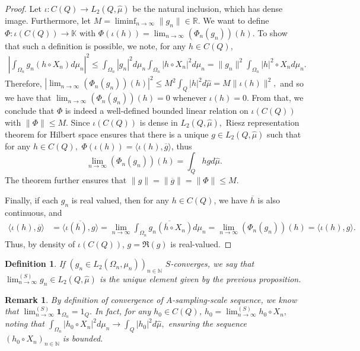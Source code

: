 \documentclass[10pt,a4paper]{amsart}
\newtheorem{definition}[thm]{Definition}
\newtheorem{remark}[thm]{Remark}
\def \HMU{\hat{\mu}}
\def \LL{\langle}
\def \RR{\rangle}
\begin{document}
\begin{proof}
	Let $\iota:C(Q)\rightarrow L_2(Q,\HMU)$ be the natural inclusion, which has dense image. Furthermore, let $M=\liminf_{n\rightarrow\infty}\|g_n\|\in\mathbb{R}.$ We want to define $\Phi:\iota(C(Q))\rightarrow\mathbb{K}$ with $\Phi(\iota(h))=\lim_{n\rightarrow\infty} (\Phi_n(g_n))(h).$ To show that such a definition is possible, we note, for any $h\in C(Q),$
	\begin{align*}
		\left|\int_{\Omega_n}g_n(h\circ X_n)d\mu_n\right|^2\leq\int_{\Omega_n}|g_n|^2d\mu_n \int_{\Omega_n}|h\circ X_n|^2d\mu_n= \|g_n\|^2 \int_{\Omega_n}|h|^2\circ X_nd\mu_n.
	\end{align*}
	Therefore, $|\lim_{n\rightarrow\infty}(\Phi_n(g_n))(h)|^2\leq M^2\int_{Q}|h|^2d\HMU=M\|\iota(h)\|^2,$ and so we have that $\lim_{n\rightarrow\infty}(\Phi_n(g_n))(h)=0$ whenever $\iota(h)=0.$ From that, we conclude that $\Phi$ is indeed a well-defined bounded linear relation on $\iota(C(Q))$ with $\|\Phi\|\leq M.$ Since $\iota(C(Q))$ is dense in $L_2(Q,\HMU),$ Riesz representation theorem for Hilbert space ensures that there is a unique $g\in L_2(Q,\HMU)$ such that for any $h\in C(Q),$ $\Phi(\iota(h))=\LL \iota(h), \overline{g}\RR$, thus $$\lim_{n\rightarrow\infty}(\Phi_n(g_n))(h)=\int_{Q}h gd\HMU.$$ The theorem further ensures that $\|g\|=\|\overline{g}\|=\|\Phi\|\leq M.$
	
	Finally, if each $g_n$ is real valued, then for any $h\in C(Q)$, we have $\overline{h}$ is also continuous, and
	\begin{align*}
		\LL \iota(h), \overline{g}\RR&= \overline{\LL \iota(\overline{h}), g\RR}=\lim_{n\rightarrow\infty}\overline{\int_{\Omega_n}g_n (\overline{h}\circ X_n)d\mu_n}=\lim_{n\rightarrow\infty}(\Phi_n(g_n))(h)=\LL \iota(h),g\RR.
	\end{align*}
	Thus, by density of $\iota(C(Q))$, $g=\Re(g)$ is real-valued.
\end{proof}
\begin{definition}
	If $(g_n\in L_2(\Omega_n,\mu_n))_{n\in\mathbb{N}}$ $S$-converges, we say that $\lim_{n\rightarrow\infty}^{(S)} g_n \in L_2(Q,\HMU)$ is the unique element given by the previous proposition.
\end{definition}
\begin{remark}\label{remark_continuous_convergence}
	By definition of convergence of $A$-sampling-scale sequence, we know that $\lim^{(S)}_{n\rightarrow\infty}\mathbf{1}_{\Omega_n}=1_{Q}.$ In fact, for any $h_0\in C(Q)$, $h_0=\lim^{(S)}_{n\rightarrow\infty}h_0\circ X_n,$ noting that $\int_{\Omega_n}|h_0\circ X_n|^2d\mu_n\rightarrow \int_{Q}|h_0|^2d\HMU,$ ensuring the sequence $(h_0\circ X_n)_{n\in\mathbb{N}}$ is bounded.
\end{remark}
\end{document}
